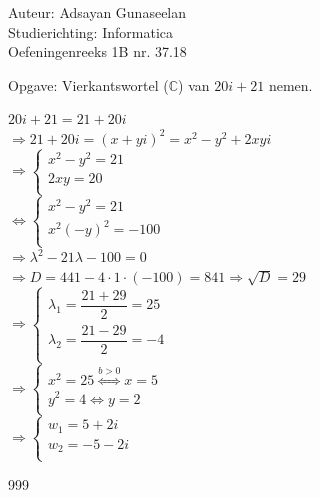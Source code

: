 \documentclass[a4paper]{article}
\begin{document}
\noindent \large Auteur: Adsayan Gunaseelan \\
\noindent \large Studierichting: Informatica\\
\noindent \large Oefeningenreeks 1B nr. 37.18\\

\medskip

\normalsize

Opgave: Vierkantswortel ($\mathbb{C}$) van $20i +21$ nemen.\

$20i +21 = 21 +20i$\\

$\Rightarrow 21 +20i = (x+yi)^2 = x^2 - y^2 + 2xyi$\\

$ \Rightarrow\left \{
\begin{array}{l} 
x^2 - y^2=21 \\
2xy=20 \\
\end{array}
\right .$\\

$ \Leftrightarrow\left \{
\begin{array}{l} 
x^2 - y^2=21 \\
x^2(-y)^2=-100\\
\end{array}
\right .$\\

$ \Rightarrow\lambda^2 - 21\lambda - 100 = 0 $\\

$ \Rightarrow D = 441-4\cdot1\cdot(-100) = 841 \Rightarrow \sqrt{D}=29 $ \\

$ \Rightarrow\left \{
\begin{array}{l} 
\lambda_1 = \dfrac{21 + 29}{2}=25\\
\lambda_2 = \dfrac{21 - 29}{2}=-4\\
\end{array}
\right .$\\

$ \Rightarrow\left \{
\begin{array}{l} 
x^2 = 25 \overset{b>0}\Leftrightarrow x= 5\\
y^2 = 4 \Leftrightarrow y = 2\\
\end{array}
\right .$\\

$ \Rightarrow\left \{
\begin{array}{l} 
w_1 = 5 + 2i \\
w_2 = -5 - 2i\\
\end{array}
\right .$\\

\begin{thebibliography}{999}
\end{thebibliography}
\end{document}
